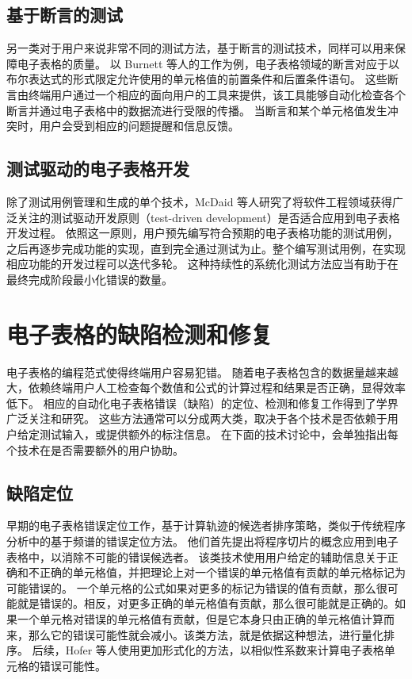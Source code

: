 \subsection{基于断言的测试}
另一类对于用户来说非常不同的测试方法，基于断言的测试技术\cite{burnett2003end,wilson2003harnessing,beckwith2002reasoning}，同样可以用来保障电子表格的质量。
以 Burnett 等人的工作\cite{burnett2003end}为例，电子表格领域的断言对应于以布尔表达式的形式限定允许使用的单元格值的前置条件和后置条件语句。
这些断言由终端用户通过一个相应的面向用户的工具来提供，该工具能够自动化检查各个断言并通过电子表格中的数据流进行受限的传播。
当断言和某个单元格值发生冲突时，用户会受到相应的问题提醒和信息反馈。

\subsection{测试驱动的电子表格开发}
除了测试用例管理和生成的单个技术，McDaid 等人\cite{mcdaid2008test}研究了将软件工程领域获得广泛关注的测试驱动开发原则（test-driven development）是否适合应用到电子表格开发过程。
依照这一原则，用户预先编写符合预期的电子表格功能的测试用例，之后再逐步完成功能的实现，直到完全通过测试为止。整个编写测试用例，在实现相应功能的开发过程可以迭代多轮。
这种持续性的系统化测试方法应当有助于在最终完成阶段最小化错误的数量。


\section{电子表格的缺陷检测和修复}

电子表格的编程范式使得终端用户容易犯错。
随着电子表格包含的数据量越来越大，依赖终端用户人工检查每个数值和公式的计算过程和结果是否正确，显得效率低下。
相应的自动化电子表格错误（缺陷）的定位、检测和修复工作得到了学界广泛关注和研究。
这些方法通常可以分成两大类，取决于各个技术是否依赖于用户给定测试输入，或提供额外的标注信息。
在下面的技术讨论中，会单独指出每个技术在是否需要额外的用户协助。

\subsection{缺陷定位}
早期的电子表格错误定位工作\cite{reichwein1999slicing,ruthruff2005interactive}，基于计算轨迹的候选者排序策略，类似于传统程序分析中的基于频谱的错误定位方法。
他们首先提出将程序切片的概念应用到电子表格中，以消除不可能的错误候选者。
该类技术使用用户给定的辅助信息关于正确和不正确的单元格值，并把理论上对一个错误的单元格值有贡献的单元格标记为可能错误的。
一个单元格的公式如果对更多的标记为错误的值有贡献，那么很可能就是错误的。相反，对更多正确的单元格值有贡献，那么很可能就是正确的。如果一个单元格对错误的单元格值有贡献，但是它本身只由正确的单元格值计算而来，那么它的错误可能性就会减小。该类方法，就是依据这种想法，进行量化排序。
后续，Hofer 等人\cite{hofer2013empirical}使用更加形式化的方法，以相似性系数来计算电子表格单元格的错误可能性。

